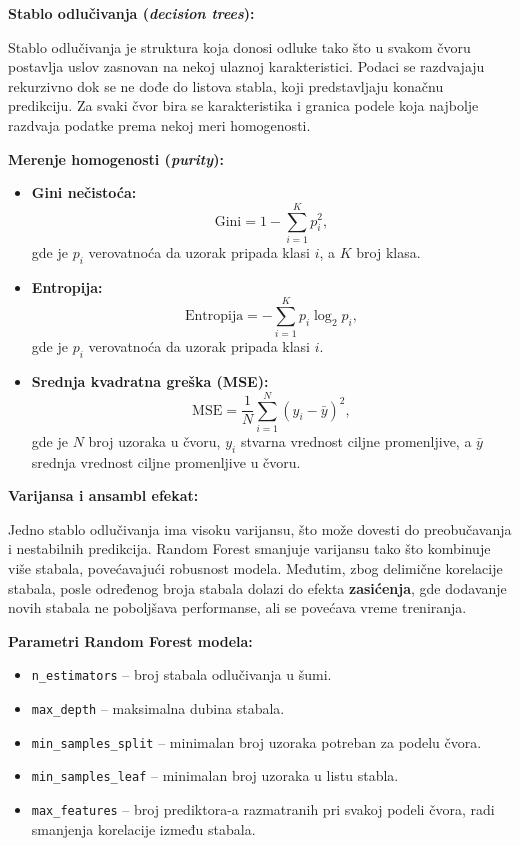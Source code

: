 \documentclass[12pt]{article}
\begin{document}
\textbf{Stablo odlučivanja (\textit{decision trees}):}

Stablo odlučivanja je struktura koja donosi odluke tako što u svakom čvoru postavlja uslov zasnovan na nekoj ulaznoj karakteristici. Podaci se razdvajaju rekurzivno dok se ne dođe do listova stabla, koji predstavljaju konačnu predikciju. Za svaki čvor bira se karakteristika i granica podele koja najbolje razdvaja podatke prema nekoj meri homogenosti.

\textbf{Merenje homogenosti (\textit{purity}):}

\begin{itemize}
    \item \textbf{Gini nečistoća:} 
    \begin{equation}
    \mathrm{Gini} = 1 - \sum_{i=1}^{K} p_i^2,
    \end{equation}
    gde je $p_i$ verovatnoća da uzorak pripada klasi $i$, a $K$ broj klasa.
    
    \item \textbf{Entropija:} 
    \begin{equation}
    \mathrm{Entropija} = - \sum_{i=1}^{K} p_i \log_2 p_i,
    \end{equation}
    gde je $p_i$ verovatnoća da uzorak pripada klasi $i$.
    
    \item \textbf{Srednja kvadratna greška (MSE):} 
    \begin{equation}
    \mathrm{MSE} = \frac{1}{N} \sum_{i=1}^{N} (y_i - \bar{y})^2,
    \end{equation}
    gde je $N$ broj uzoraka u čvoru, $y_i$ stvarna vrednost ciljne promenljive, a $\bar{y}$ srednja vrednost ciljne promenljive u čvoru.
\end{itemize}


\textbf{Varijansa i ansambl efekat:}

Jedno stablo odlučivanja ima visoku varijansu, što može dovesti do preobučavanja i nestabilnih predikcija. Random Forest smanjuje varijansu tako što kombinuje više stabala, povećavajući robusnost modela. Međutim, zbog delimične korelacije stabala, posle određenog broja stabala dolazi do efekta \textbf{zasićenja}, gde dodavanje novih stabala ne poboljšava performanse, ali se povećava vreme treniranja.

\textbf{Parametri Random Forest modela:}

\begin{itemize}
    \item \texttt{n\_estimators} -- broj stabala odlučivanja u šumi.
    \item \texttt{max\_depth} -- maksimalna dubina stabala.
    \item \texttt{min\_samples\_split} -- minimalan broj uzoraka potreban za podelu čvora.
    \item \texttt{min\_samples\_leaf} -- minimalan broj uzoraka u listu stabla.
    \item \texttt{max\_features} -- broj prediktora-a razmatranih pri svakoj podeli čvora, radi smanjenja korelacije između stabala.
\end{itemize}
\end{document}
